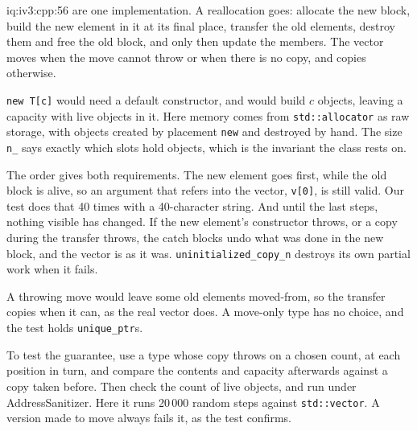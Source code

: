 \begin{solution}{iq:iv3:cpp:56}
 are one implementation. A reallocation goes: allocate the new block, build the new element in it at its final place, transfer the old elements, destroy them and free the old block, and only then update the members. The vector moves when the move cannot throw or when there is no copy, and copies otherwise.
\label{lst:iv3:cp:vec1}
\label{lst:iv3:cp:vec2}

\texttt{new T[c]} would need a default constructor, and would build $c$ objects, leaving a capacity with live objects in it. Here memory comes from \texttt{std::allocator} as raw storage, with objects created by placement \texttt{new} and destroyed by hand. The size \texttt{n\_} says exactly which slots hold objects, which is the invariant the class rests on.

The order gives both requirements. The new element goes first, while the old block is alive, so an argument that refers into the vector, \texttt{v[0]}, is still valid. Our test does that 40 times with a 40-character string. And until the last steps, nothing visible has changed. If the new element's constructor throws, or a copy during the transfer throws, the catch blocks undo what was done in the new block, and the vector is as it was. \texttt{uninitialized\_copy\_n} destroys its own partial work when it fails.

A throwing move would leave some old elements moved-from, so the transfer copies when it can, as the real vector does. A move-only type has no choice, and the test holds \texttt{unique\_ptr}s.

To test the guarantee, use a type whose copy throws on a chosen count, at each position in turn, and compare the contents and capacity afterwards against a copy taken before. Then check the count of live objects, and run under AddressSanitizer. Here it runs 20\,000 random steps against \texttt{std::vector}. A version made to move always fails it, as the test confirms.

\end{solution}

